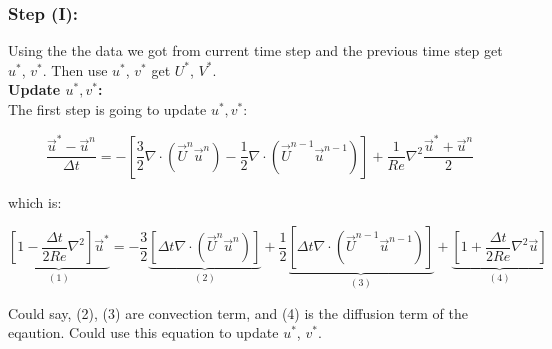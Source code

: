 \documentclass[12pt]{article}
\begin{document}







\subsubsection{Step (I):}
Using the the data we got from current time step and the previous time step get $u^{*}$, $v^{*}$.
    Then use $u^{*}$, $v^{*}$ get $U^{*}$, $V^{*}$.\\



\textbf{Update $u^*, v^*$:}\\


The first step is going to update $u^*, v^*$:


\begin{equation}
    \frac{\vec{u}^{*} - \vec{u}^{n}}{\Delta t} = -[\frac{3}{2} \nabla \cdot (\vec{U}^n \vec{u}^{n}) - \frac{1}{2} \nabla \cdot (\vec{U}^{n-1} \vec{u}^{n-1}) ] + \frac{1}{Re} \nabla^{2} \frac{\vec{u}^*+\vec{u}^{n}}{2}
\end{equation}
    
which is:


    \begin{equation}
    \underbrace{[1 - \frac{\Delta t}{2Re}\nabla^2]\vec{u}^{*}}_{(1)} 
    = 
    -\frac{3}{2} \underbrace{[\Delta t \nabla \cdot (\vec{U}^n \vec{u}^{n})]}_{(2)} 
    + \frac{1}{2} \underbrace{[\Delta t  \nabla \cdot (\vec{U}^{n-1} \vec{u}^{n-1})]}_{(3)} 
    +\underbrace{[1+ \frac{\Delta t}{2Re} \nabla^{2} \vec{u}]}_{(4)}
\end{equation}

Could say, (2), (3) are convection term, and (4) is the diffusion term of the eqaution. 
Could use this equation to update $u^*$, $v^*$.\\
\end{document}
